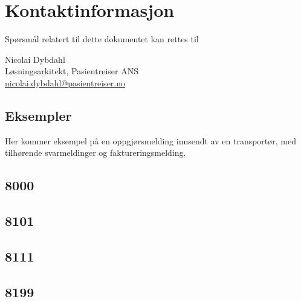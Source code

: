 \documentclass[a4paper,titlepage,norsk,11pt]{article}
\begin{document}
\section{Kontaktinformasjon}

Spørsmål relatert til dette dokumentet kan rettes til

Nicolai Dybdahl \\
Løsningsarkitekt, Pasientreiser ANS \\
\href{mailto:nicolai.dybdahl@pasientreiser.no}{nicolai.dybdahl@pasientreiser.no}

\begin{appendices}

\section{Eksempler}
\label{sec:Eksempler}
\lstset{basicstyle=\ttfamily\scriptsize}

Her kommer eksempel på en oppgjørsmelding innsendt av en transportør, med tilhørende svarmeldinger og faktureringsmelding.

\subsection{8000}


\subsection{8101}


\subsection{8111}


\subsection{8199}


\end{appendices}
\end{document}
